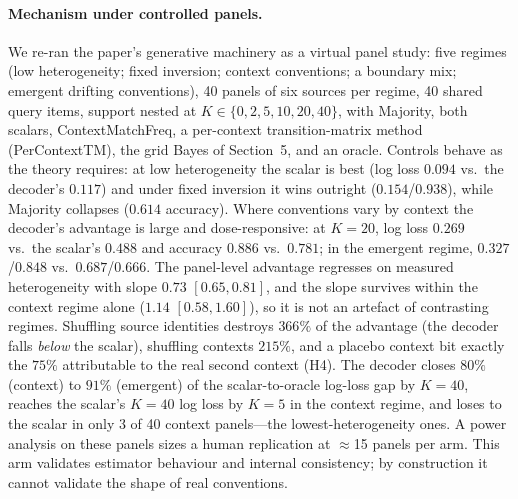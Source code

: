 \paragraph{Mechanism under controlled panels.}
We re-ran the paper's generative machinery as a virtual panel study:
five regimes (low heterogeneity; fixed inversion; context
conventions; a boundary mix; emergent drifting conventions), 40
panels of six sources per regime, 40 shared query items, support
nested at $K \in \{0,2,5,10,20,40\}$, with Majority, both scalars,
ContextMatchFreq, a per-context transition-matrix method
(PerContextTM), the grid Bayes of Section~5, and an oracle. Controls
behave as the theory requires: at low heterogeneity the scalar is
best (log loss $0.094$ vs.\ the decoder's $0.117$) and under fixed
inversion it wins outright ($0.154$/$0.938$), while Majority
collapses ($0.614$ accuracy). Where conventions vary by context the
decoder's advantage is large and dose-responsive: at $K{=}20$, log
loss $0.269$ vs.\ the scalar's $0.488$ and accuracy $0.886$ vs.\
$0.781$; in the emergent regime, $0.327$/$0.848$ vs.\ $0.687$/$0.666$.
The panel-level advantage regresses on measured heterogeneity with
slope $0.73$ $[0.65, 0.81]$, and the slope survives within the
context regime alone ($1.14$ $[0.58, 1.60]$), so it is not an artefact
of contrasting regimes. Shuffling source identities destroys $366\%$
of the advantage (the decoder falls \emph{below} the scalar),
shuffling contexts $215\%$, and a placebo context bit exactly the
$75\%$ attributable to the real second context (H4). The decoder
closes $80\%$ (context) to $91\%$ (emergent) of the scalar-to-oracle
log-loss gap by $K{=}40$, reaches the scalar's $K{=}40$ log loss by
$K{=}5$ in the context regime, and loses to the scalar in only 3 of
40 context panels---the lowest-heterogeneity ones. A power analysis
on these panels sizes a human replication at $\approx$15 panels per
arm. This arm validates estimator behaviour and internal
consistency; by construction it cannot validate the shape of real
conventions.

